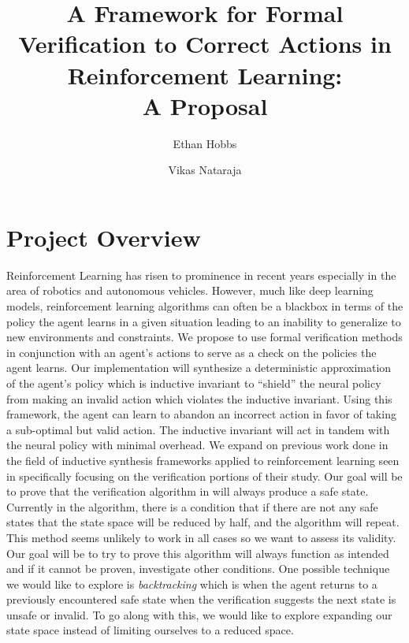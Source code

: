 \documentclass[11pt]{article}
\begin{document}
\title{A Framework for Formal Verification to Correct Actions in Reinforcement Learning: \\
A Proposal}
 
\author{
{Ethan Hobbs} \and {Vikas Nataraja}
}

\maketitle

\setcounter{page}{1}



\section{Project Overview}
Reinforcement Learning has risen to prominence in recent years especially in the area of robotics and autonomous vehicles. However, much like deep learning models, reinforcement learning algorithms can often be a blackbox in terms of the policy the agent learns in a given situation leading to an inability to generalize to new environments and constraints. We propose to use formal verification methods in conjunction with an agent’s actions to serve as a check on the policies the agent learns. Our implementation will synthesize a deterministic approximation of the agent’s policy which is inductive invariant to “shield” the neural policy from making an invalid action which violates the inductive invariant. Using this framework, the agent can learn to abandon an incorrect action in favor of taking a sub-optimal but valid action. The inductive invariant will act in tandem with the neural policy with minimal overhead. We expand on previous work done in the field of inductive synthesis frameworks applied to reinforcement learning seen in \cite{zhu:2019} specifically focusing on the verification portions of their study. Our goal will be to prove that the verification algorithm in \cite{zhu:2019} will always produce a safe state. Currently in the algorithm, there is a condition that if there are not any safe states that the state space will be reduced by half, and the algorithm will repeat. This method seems unlikely to work in all cases so we want to assess its validity. Our goal will be to try to prove this algorithm will always function as intended and if it cannot be proven, investigate other conditions. One possible technique we would like to explore is \emph{backtracking} which is when the agent returns to a previously encountered safe state when the verification suggests the next state is unsafe or invalid. To go along with this, we would like to explore expanding our state space instead of limiting ourselves to a reduced space.
\end{document}
